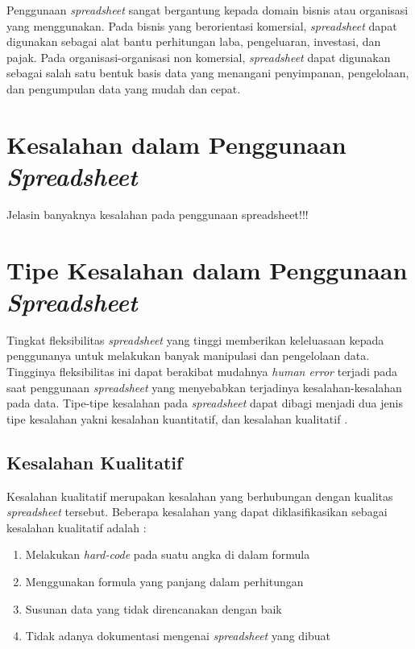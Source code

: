Penggunaan \textit{spreadsheet} sangat bergantung kepada domain bisnis atau organisasi yang menggunakan. Pada bisnis yang berorientasi komersial, \textit{spreadsheet} dapat digunakan sebagai alat bantu perhitungan laba, pengeluaran, investasi, dan pajak. Pada organisasi-organisasi non komersial, \textit{spreadsheet} dapat digunakan sebagai salah satu bentuk basis data yang menangani penyimpanan, pengelolaan, dan pengumpulan data yang mudah dan cepat.

\section{Kesalahan dalam Penggunaan \textit{Spreadsheet}}
Jelasin banyaknya kesalahan pada penggunaan spreadsheet!!!

\section{Tipe Kesalahan dalam Penggunaan \textit{Spreadsheet}}
Tingkat fleksibilitas \textit{spreadsheet} yang tinggi memberikan keleluasaan kepada penggunanya untuk melakukan banyak manipulasi dan pengelolaan data. Tingginya fleksibilitas ini dapat berakibat mudahnya \textit{human error} terjadi pada saat penggunaan \textit{spreadsheet} yang menyebabkan terjadinya kesalahan-kesalahan pada data. Tipe-tipe kesalahan pada \textit{spreadsheet} dapat dibagi menjadi dua jenis tipe kesalahan yakni kesalahan kuantitatif, dan kesalahan kualitatif \parencite{Panko1998}.

    \subsection{Kesalahan Kualitatif}
    Kesalahan kualitatif merupakan kesalahan yang berhubungan dengan kualitas \textit{spreadsheet} tersebut. Beberapa kesalahan yang dapat diklasifikasikan sebagai kesalahan kualitatif adalah \parencite{Powell2009}:

    \begin{enumerate}
        \item Melakukan \textit{hard-code} pada suatu angka di dalam formula
        \item Menggunakan formula yang panjang dalam perhitungan
        \item Susunan data yang tidak direncanakan dengan baik
        \item Tidak adanya dokumentasi mengenai \textit{spreadsheet} yang dibuat
    \end{enumerate}

